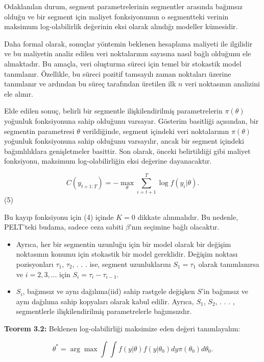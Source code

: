 \documentclass[12pt,twoside]{deuthesis}
\providecommand{\tightlist}{%
  \setlength{\itemsep}{0pt}\setlength{\parskip}{0pt}}
\begin{document}
Odaklanılan durum, segment parametrelerinin segmentler arasında bağımsız olduğu ve bir segment için maliyet fonksiyonunun o segmentteki verinin maksimum log-olabilirlik değerinin eksi olarak alındığı modeller kümesidir.

Daha formal olarak, sonuçlar yöntemin beklenen hesaplama maliyeti ile ilgilidir ve bu maliyetin analiz edilen veri noktalarının sayısına nasıl bağlı olduğunu ele almaktadır. Bu amaçla, veri oluşturma süreci için temel bir stokastik model tanımlanır. Özellikle, bu süreci pozitif tamsayılı zaman noktaları üzerine tanımlanır ve ardından bu süreç tarafından üretilen ilk \(n\) veri noktasının analizini ele alınır.

Elde edilen sonuç, belirli bir segmentle ilişkilendirilmiş parametrelerin \(\pi(\theta)\) yoğunluk fonksiyonuna sahip olduğunu varsayar. Gösterim basitliği açısından, bir segmentin parametresi \(\theta\) verildiğinde, segment içindeki veri noktalarının \(\pi(\theta)\) yoğunluk fonksiyonuna sahip olduğunu varsayılır, ancak bir segment içindeki bağımlılıklara genişletmeler basittir. Son olarak, önceki belirtildiği gibi maliyet fonksiyonu, maksimum log-olabilirliğin eksi değerine dayanacaktır.

\[ C(y_{t+1:T}) = - \max_{\theta} \sum_{i=t+1}^{T} \log f(y_i|\theta). \] (5)

Bu kayıp fonksiyonu için (4) içinde \(K = 0\) dikkate alınmalıdır. Bu nedenle, PELT'teki budama, sadece ceza sabiti \(\beta\)'nın seçimine bağlı olacaktır.

\begin{itemize}
\tightlist
\item
  Ayrıca, her bir segmentin uzunluğu için bir model olarak bir değişim noktasının konumu için stokastik bir model gereklidir. Değişim noktası pozisyonları \(\tau_1\), \(\tau_2\), . . . ise, segment uzunluklarını \(S_1 = \tau_1\) olarak tanımlanırsa ve \(i = 2, 3, . . .\) için \(S_i = \tau_i - \tau_{i-1}\).
\item
  \(S_i\), bağımsız ve aynı dağılıma(iid) sahip rastgele değişken \(S\)'in bağımsız ve aynı dağılıma sahip kopyaları olarak kabul edilir. Ayrıca, \(S_1\), \(S_2\), . . . , segmentlerle ilişkilendirilmiş parametrelerle bağımsızdır.
\end{itemize}

\textbf{Teorem 3.2:} Beklenen log-olabilirliği maksimize eden değeri tanımlayalım:

\[ \theta^* = \arg\max \int \int f(y|\theta)f(y|\theta_0)dy\pi(\theta_0)d\theta_0. \]
\end{document}
